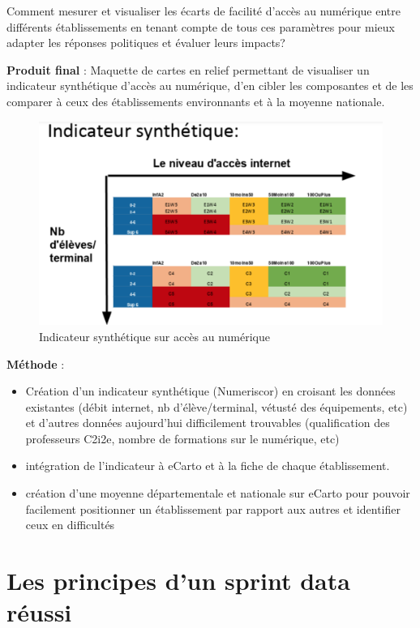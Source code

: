 \documentclass[]{book}
\providecommand{\tightlist}{%
  \setlength{\itemsep}{0pt}\setlength{\parskip}{0pt}}
\begin{document}
Comment mesurer et visualiser les écarts de facilité d'accès au
numérique entre différents établissements en tenant compte de tous ces
paramètres pour mieux adapter les réponses politiques et évaluer leurs
impacts?

\textbf{Produit final} : Maquette de cartes en relief permettant de
visualiser un indicateur synthétique d'accès au numérique, d'en cibler
les composantes et de les comparer à ceux des établissements
environnants et à la moyenne nationale.

\begin{figure}

{\centering \includegraphics[width=0.7\linewidth]{./img/pan} 

}

\caption{Indicateur synthétique sur accès au numérique}\label{fig:unnamed-chunk-12}
\end{figure}

\textbf{Méthode} :

\begin{itemize}
\tightlist
\item
  Création d'un indicateur synthétique (Numeriscor) en croisant les
  données existantes (débit internet, nb d'élève/terminal, vétusté des
  équipements, etc) et d'autres données aujourd'hui difficilement
  trouvables (qualification des professeurs C2i2e, nombre de formations
  sur le numérique, etc)
\item
  intégration de l'indicateur à eCarto et à la fiche de chaque
  établissement.
\item
  création d'une moyenne départementale et nationale sur eCarto pour
  pouvoir facilement positionner un établissement par rapport aux autres
  et identifier ceux en difficultés
\end{itemize}

\chapter{Les principes d'un sprint data réussi}\label{principes}
\end{document}
